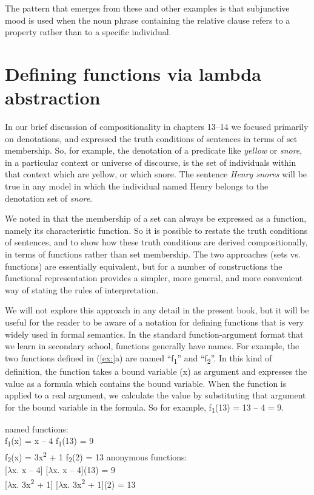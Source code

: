 The pattern that emerges from these and other examples is that subjunctive mood is used when the noun phrase containing the relative clause refers to a property rather than to a specific individual.


\section{Defining functions via lambda abstraction}\label{sec:15.6}

In our brief discussion of compositionality in chapters 13–14 we focused primarily on denotations, and expressed the truth conditions of sentences in terms of set membership. So, for example, the denotation of a predicate like \textit{yellow} or \textit{snore}, in a particular context or universe of discourse, is the set of individuals within that context which are yellow, or which snore. The sentence \textit{Henry snores} will be true in any model in which the individual named Henry belongs to the denotation set of \textit{snore}.



We noted in  that the membership of a set can always be expressed as a function, namely its characteristic function. So it is possible to restate the truth conditions of sentences, and to show how these truth conditions are derived compositionally, in terms of functions rather than set membership. The two approaches (sets vs. functions) are essentially equivalent, but for a number of constructions the functional representation provides a simpler, more general, and more convenient way of stating the rules of interpretation.



We will not explore this approach in any detail in the present book, but it will be useful for the reader to be aware of a notation for defining functions that is very widely used in formal semantics. In the standard function-argument format that we learn in secondary school, functions generally have names. For example, the two functions defined in (\ref{ex:}a) are named “f\textsubscript{1}” and “f\textsubscript{2}”. In this kind of definition, the function takes a bound variable (x) as argument and expresses the value as a formula which contains the bound variable. When the function is applied to a real argument, we calculate the value by substituting that argument for the bound variable in the formula. So for example, f\textsubscript{1}(13) = 13 – 4 = 9.


\ea
\ea  named functions:\\
f\textsubscript{1}(x) = x – 4  f\textsubscript{1}(13) = 9\\
f\textsubscript{2}(x) = 3x\textsuperscript{2} + 1  f\textsubscript{2}(2) = 13
\ex  anonymous functions:\\
{}[$\lambda $x. x – 4]  [$\lambda $x. x – 4](13) = 9\\
{}[$\lambda $x. 3x\textsuperscript{2} + 1]  [$\lambda $x. 3x\textsuperscript{2} + 1](2) = 13
\z \z


